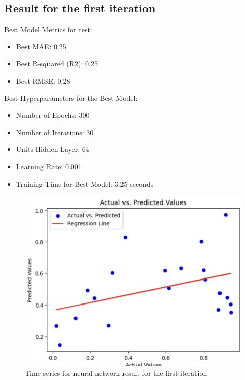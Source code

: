\documentclass[10pt]{article} %
\begin{document}
    \subsection{Result for the first iteration}

    Best Model Metrics for test:
    \begin{itemize}
        \item Best MAE: 0.25
        \item Best R-squared (R2): 0.25
        \item Best RMSE: 0.28
    \end{itemize}

Best Hyperparameters for the Best Model:

    \begin{itemize}
        \item Number of Epochs: 300
        \item Number of Iterations: 30
        \item Units Hidden Layer: 64
        \item Learning Rate: 0.001
        \item Training Time for Best Model: 3.25 seconds
    \end{itemize}

    \begin{figure}
        \centering
        \includegraphics[scale=0.4]{Assets/iteration 1/nn_it1_1.png}
        \caption{Time series for neural network result for the first iteration}
        \label{fig:enter-label}
    \end{figure}
\end{document}
